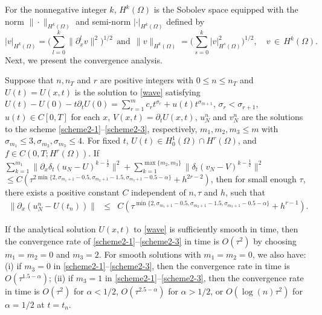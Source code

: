 \documentclass[10pt]{siamltex}
\newcommand{\px}[1][x]{\partial_{#1}}
\begin{document}
For the nonnegative integer $k$, $H^k(\Omega)$ is the Sobolev space
equipped with the norm $\|\cdot\|_{H^k(\Omega)}$ and  semi-norm
$|\cdot|_{H^k(\Omega)}$ defined by
$$|v|_{H^k(\Omega)}=\bigg(\sum_{l=0}^{k}\|\partial^{l}_x v\|^2\bigg)^{1/2}
~~\text{and}~~\|v\|_{H^k(\Omega)}=\bigg(\sum_{s=0}^{k}|v|^2_{H^s(\Omega)}\bigg)^{1/2},{\quad}v{\,\in\,}H^k(\Omega).$$
Next, we present the convergence analysis.
\begin{theorem}\label{thm:convergence}
Suppose that $n,n_T$ and $r$ are positive integers with $0\leq n\leq n_T$ and
$U(t)=U(x,t)$ is the solution to \eqref{wave} satisfying
{$U(t)-U(0)-t\px[t]U(0)=\sum_{r=1}^{m}c_rt^{\sigma_r}+u(t)t^{\sigma_{m+1}}$,
$\sigma_{r} < \sigma_{r+1}$, $u(t)\in C[0,T]$ for each  $x$,}
$V(x,t)=\px[t]U(x,t)$, $u_N^n$ and $v_N^n$
are the solutions to the scheme \eqref{scheme2-1}--\eqref{scheme2-3}, respectively,
$m_1,m_2,m_3\leq m$
with $\sigma_{m_1}\leq 3,\sigma_{m_2},\sigma_{m_3}\leq4$.
For fixed $t$, $U(t)\in H_0^1(\Omega)\cap H^r(\Omega)$, and $f\in C(0,T;H^r(\Omega))$.
If $\sum_{k=1}^{m_1}\|\px[x]\delta_t(u_N-U)^{k-\frac{1}{2}}\|^2
+\sum_{k=1}^{\max\{m_2,m_3\}}\|\delta_t(v_N-V)^{k-\frac{1}{2}}\|^2$
$\leq C\left(\tau^{2\min\{2,\sigma_{m_1+1}-0.5,\sigma_{m_2+1}-1.5,\sigma_{m_3+1}-0.5-\alpha\}}
+ h^{2r-2}\right)$,
then for small enough $\tau$, there exists a positive constant $C$
independent of $n,\tau$ and $h$, such that
\begin{eqnarray*}
\|\px (u_N^{n}-U(t_n))\|
&\leq& C\left(\tau^{\min\{2,\sigma_{m_1+1}-0.5,\sigma_{m_2+1}-1.5,\sigma_{m_3+1}-0.5-\alpha\}}
+ h^{r-1}\right).\label{s5:eq-9}
\end{eqnarray*}
\end{theorem}
\vskip -10pt
\begin{remark}\label{remark6}
If the analytical solution $U(x,t)$ to  \eqref{wave} is sufficiently smooth in time, then
the convergence rate of \eqref{scheme2-1}--\eqref{scheme2-3} in time is $O(\tau^{2})$ by choosing
$m_1=m_2=0$ and $m_3=2$. For smooth solutions with $m_1=m_2=0$, we also have:
(i) if $m_3=0$ in \eqref{scheme2-1}--\eqref{scheme2-3}, then the convergence rate in time
is $O(\tau^{1.5-\alpha})$;
(ii) if  $m_3=1$ in \eqref{scheme2-1}--\eqref{scheme2-3}, then the convergence rate in time
is $O(\tau^{2})$ for $\alpha<1/2$,  $O(\tau^{2.5-\alpha})$    for $\alpha>1/2$,
or  $O(\log(n)\tau^{2})$  for $\alpha=1/2$ at $t=t_n$.
\end{remark}
\end{document}
